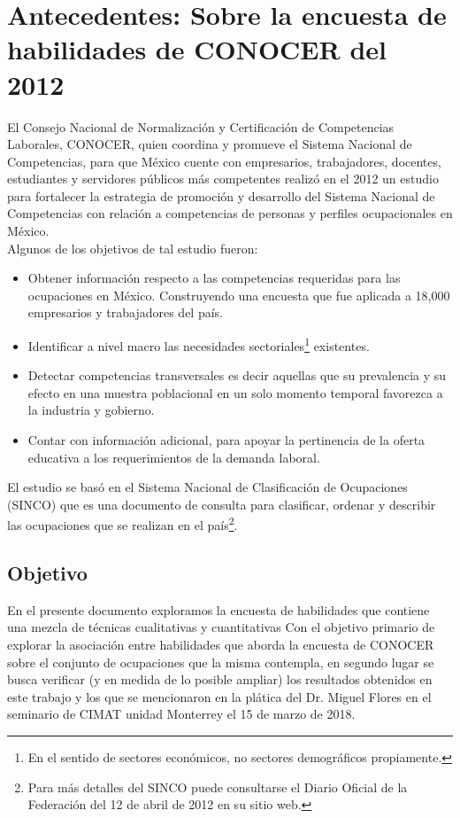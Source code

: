 \documentclass[paper=letter, fontsize=11pt]{scrartcl}
\numberwithin{equation}{section} %
\numberwithin{figure}{section} %
\numberwithin{table}{section} %
\begin{document}
\section{Antecedentes: Sobre la encuesta de habilidades de CONOCER del 2012}
El Consejo Nacional de Normalización y Certificación de Competencias Laborales, CONOCER, quien coordina y promueve el Sistema Nacional de Competencias, para que México cuente con empresarios, trabajadores, docentes, estudiantes y servidores públicos más competentes realizó en el 2012 un estudio para fortalecer la estrategia de promoción y desarrollo del Sistema Nacional de Competencias con relación a competencias de personas y perfiles ocupacionales en México.\\
Algunos de los objetivos de tal estudio fueron:
\begin{itemize}
\item Obtener información respecto a las competencias requeridas para las ocupaciones en México. Construyendo una encuesta que fue aplicada a 18,000 empresarios y trabajadores del país.

\item Identificar a nivel macro las necesidades sectoriales\footnote{En el sentido de sectores económicos, no sectores demográficos propiamente.} existentes.

\item Detectar competencias transversales es decir aquellas que su prevalencia y su efecto en una muestra poblacional en un solo momento temporal favorezca a la industria y gobierno.

\item Contar con información adicional, para apoyar la pertinencia de la oferta educativa a los requerimientos de la demanda laboral.
\end{itemize}
El estudio se basó en el Sistema Nacional de Clasificación de Ocupaciones (SINCO) que es una documento de consulta para clasificar, ordenar y describir las ocupaciones que se realizan en el país\footnote{ Para más detalles del SINCO puede consultarse el Diario Oficial de la Federación del 12 de abril de 2012 en su sitio web.}.\\

\subsection{Objetivo}

En el presente documento exploramos la encuesta de habilidades que contiene una mezcla de técnicas cualitativas y cuantitativas Con el objetivo primario de explorar la asociación entre habilidades que aborda la encuesta de CONOCER sobre el conjunto de ocupaciones que la misma contempla, en segundo lugar se busca verificar (y en medida de lo posible ampliar) los resultados obtenidos en este trabajo y los que se mencionaron en la plática del Dr. Miguel Flores en el seminario de CIMAT unidad Monterrey el 15 de marzo de 2018.
\end{document}
